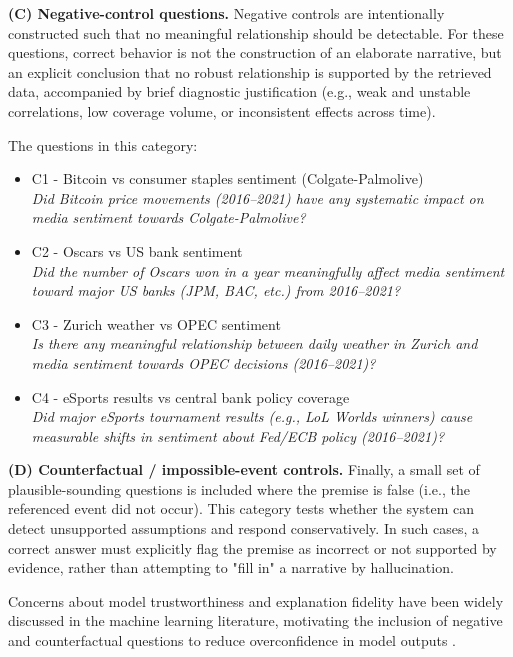 \textbf{(C) Negative-control questions.}
Negative controls are intentionally constructed such that no meaningful relationship should be detectable. For these questions, correct behavior is not the construction of an elaborate narrative, but an explicit conclusion that no robust relationship is supported by the retrieved data, accompanied by brief diagnostic justification (e.g., weak and unstable correlations, low coverage volume, or inconsistent effects across time).

The questions in this category:
\begin{itemize}
    \item C1 - Bitcoin vs consumer staples sentiment (Colgate-Palmolive) \\ \textit{Did Bitcoin price movements (2016–2021) have any systematic impact on media sentiment towards Colgate-Palmolive?}
    \item C2 - Oscars vs US bank sentiment \\ \textit{Did the number of Oscars won in a year meaningfully affect media sentiment toward major US banks (JPM, BAC, etc.) from 2016–2021?}
    \item C3 - Zurich weather vs OPEC sentiment \\ \textit{Is there any meaningful relationship between daily weather in Zurich and media sentiment towards OPEC decisions (2016–2021)?}
    \item C4 - eSports results vs central bank policy coverage \\ \textit{Did major eSports tournament results (e.g., LoL Worlds winners) cause measurable shifts in sentiment about Fed/ECB policy (2016–2021)?}
\end{itemize}

\textbf{(D) Counterfactual / impossible-event controls.}
Finally, a small set of plausible-sounding questions is included where the premise is false (i.e., the referenced event did not occur). This category tests whether the system can detect unsupported assumptions and respond conservatively. In such cases, a correct answer must explicitly flag the premise as incorrect or not supported by evidence, rather than attempting to "fill in" a narrative by hallucination.

Concerns about model trustworthiness and explanation fidelity have been widely discussed in the machine learning literature, motivating the inclusion of negative and counterfactual questions to reduce overconfidence in model outputs \cite{ribeiro2016whyitrustyou}.

